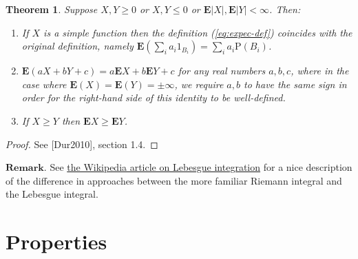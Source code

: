 \documentclass[11pt]{report}
\theoremstyle{plain}
\newtheorem{thm}{Theorem}[chapter]
\theoremstyle{definition}
\begin{document}
\begin{thm}
Suppose $X,Y\ge 0$ or $X,Y\le 0$ or
$\mathbf{E} |X|, \mathbf{E}|Y|<\infty$. Then:

\begin{enumerate}[label=\arabic*.]
\item If $X$ is a simple function then the definition
(\ref{eq:expec-def}) coincides with the original
definition, namely
$\mathbf{E}(\sum_i a_i 1_{B_i}) = \sum_i a_i
\mathrm{P}(B_i)$.

\item $\mathbf{E}(aX+bY+c)=a\mathbf{E} X + b\mathbf{E} Y+c$
for any real numbers $a,b,c$, where in the case where
$\mathbf{E}(X)=\mathbf{E}(Y) = \pm \infty$, we
require $a,b$ to have the same sign in order for the
right-hand side of this identity to be well-defined.

\item If $X\ge Y$ then $\mathbf{E} X\ge \mathbf{E} Y$.
\end{enumerate}

\end{thm}

\begin{proof}
See [Dur2010], section 1.4.
\end{proof}

$\textbf{Remark.}$ See \href{http://en.wikipedia.org/wiki/Lebesgue_integration\#Intuitive_interpretation}{the Wikipedia article on
Lebesgue
integration}
for a nice description of the difference in approaches
between the more familiar Riemann integral and the
Lebesgue integral.

\section{Properties}
\label{sec-expec-prop}
\end{document}
